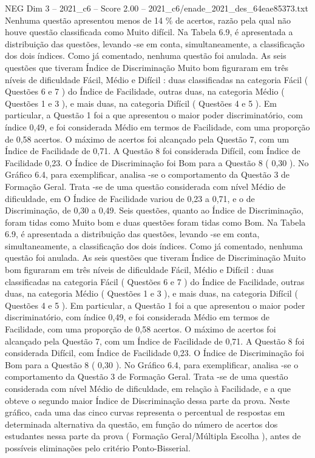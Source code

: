 \begin{textsample}{NEG Dim 3 – 2021\_c6 – Score 2.00 – 2021\_c6/enade\_2021\_des\_64eae85373.txt}
Nenhuma questão apresentou menos de 14 \% de acertos, razão pela qual não houve questão classificada como Muito difícil.
Na Tabela 6.9, é apresentada a distribuição das questões, levando -se em conta, simultaneamente, a classificação dos dois índices.
Como já comentado, nenhuma questão foi anulada.
As seis questões que tiveram Índice de Discriminação Muito bom figuraram em três níveis de dificuldade Fácil, Médio e Difícil : duas classificadas na categoria Fácil ( Questões 6 e 7 ) do Índice de Facilidade, outras duas, na categoria Médio ( Questões 1 e 3 ), e mais duas, na categoria Difícil ( Questões 4 e 5 ).
Em particular, a Questão 1 foi a que apresentou o maior poder discriminatório, com índice 0,49, e foi considerada Médio em termos de Facilidade, com uma proporção de 0,58 acertos.
O máximo de acertos foi alcançado pela Questão 7, com um Índice de Facilidade de 0,71.
A Questão 8 foi considerada Difícil, com Índice de Facilidade 0,23.
O Índice de Discriminação foi Bom para a Questão 8 ( 0,30 ).
No Gráfico 6.4, para exemplificar, analisa -se o comportamento da Questão 3 de Formação Geral.
Trata -se de uma questão considerada com nível Médio de dificuldade, em O Índice de Facilidade variou de 0,23 a 0,71, e o de Discriminação, de 0,30 a 0,49.
Seis questões, quanto ao Índice de Discriminação, foram tidas como Muito bom e duas questões foram tidas como Bom.
Na Tabela 6.9, é apresentada a distribuição das questões, levando -se em conta, simultaneamente, a classificação dos dois índices.
Como já comentado, nenhuma questão foi anulada.
As seis questões que tiveram Índice de Discriminação Muito bom figuraram em três níveis de dificuldade Fácil, Médio e Difícil : duas classificadas na categoria Fácil ( Questões 6 e 7 ) do Índice de Facilidade, outras duas, na categoria Médio ( Questões 1 e 3 ), e mais duas, na categoria Difícil ( Questões 4 e 5 ).
Em particular, a Questão 1 foi a que apresentou o maior poder discriminatório, com índice 0,49, e foi considerada Médio em termos de Facilidade, com uma proporção de 0,58 acertos.
O máximo de acertos foi alcançado pela Questão 7, com um Índice de Facilidade de 0,71.
A Questão 8 foi considerada Difícil, com Índice de Facilidade 0,23.
O Índice de Discriminação foi Bom para a Questão 8 ( 0,30 ).
No Gráfico 6.4, para exemplificar, analisa -se o comportamento da Questão 3 de Formação Geral.
Trata -se de uma questão considerada com nível Médio de dificuldade, em relação à Facilidade, e a que obteve o segundo maior Índice de Discriminação dessa parte da prova.
Neste gráfico, cada uma das cinco curvas representa o percentual de respostas em determinada alternativa da questão, em função do número de acertos dos estudantes nessa parte da prova ( Formação Geral/Múltipla Escolha ), antes de possíveis eliminações pelo critério Ponto-Bisserial.

\end{textsample}
